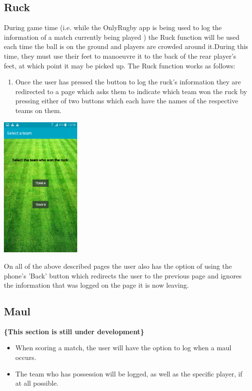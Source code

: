 \documentclass[hidelinks,a4paper,12pt]{article}
\begin{document}
	\subsection{Ruck}
		During game time (i.e. while the OnlyRugby app is being used to log the information of a match currently being played ) the Ruck function will be used each time the ball is on the ground and players are crowded around it.During this time, they must use their feet to manoeuvre it to the back of the rear player's feet, at which point it may be picked up. The Ruck function works as follows:
		\begin{enumerate}
			\item Once the user has pressed the button to log the ruck's information they are redirected to a page which asks them to indicate which
			team won the ruck by pressing either of two buttons which each have the names of the respective teams on them.
		\end{enumerate}
		\begin{center}
  			 \includegraphics[width=0.3\textwidth] {./images/choose_ruck_team.png}\\[0.4cm]
		\end{center}
	On all of the above described pages the user also has the option of using the phone's  'Back' button which redirects the user to the previous page and ignores the information that was logged on the page it is now leaving.

	\subsection{Maul}
	{\bfseries\{This section is still under development\}}
		\begin{itemize}
			\item When scoring a match, the user will have the option to log when a maul occurs.
			\item The team who has possession will be logged, as well as the specific player, if at all possible.
		\end{itemize}
\end{document}
